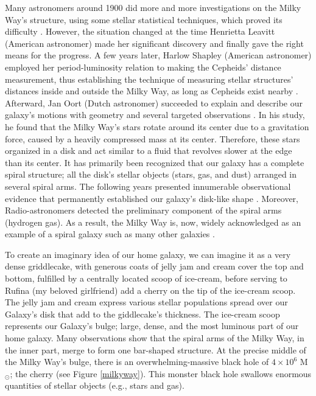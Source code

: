 Many astronomers around 1900 did more and more investigations on the Milky Way's structure, using some stellar statistical techniques, which proved its difficulty \citep{1910KNAB...13..239P,1912JRASC...6..225E,1922HarCi.242....6B,1936PA.....44..466P,1939HarCi.424....1B,1943PhDT.........2M,1950Natur.165..487B,2018RAA....18..146X,2019MNRAS.487.1400C}. However, the situation changed at the time Henrietta Leavitt (American astronomer) made her significant discovery \citep[period-luminosity relation,][]{1908AnHar..60...87L,1912HarCi.173....1L} and finally gave the right means for the progress. A few years later, Harlow Shapley (American astronomer) employed her period-luminosity relation to making the Cepheids' distance measurement, thus establishing the technique of measuring stellar structures' distances inside and outside the Milky Way, as long as Cepheids exist nearby \citep{1927HarCi.314....1S}. Afterward, Jan Oort (Dutch astronomer) succeeded to explain and describe our galaxy's motions with geometry and several targeted observations \citep{1927BAN.....4...79O}. In his study, he found that the Milky Way's stars rotate around its center due to a gravitation force, caused by a heavily compressed mass at its center. Therefore, these stars organized in a disk and act similar to a fluid that revolves slower at the edge than its center. It has primarily been recognized that our galaxy has a complete spiral structure; all the disk's stellar objects (stars, gas, and dust) arranged in several spiral arms. The following years presented innumerable observational evidence that permanently established our galaxy's disk-like shape \citep{2018ApJ...859L...8H}. Moreover, Radio-astronomers detected the preliminary component of the spiral arms (hydrogen gas). As a result, the Milky Way is, now, widely acknowledged as an example of a spiral galaxy such as many other galaxies \citep[e.g.,] [Andromeda and NGC 6744]{2017PhDT........53Y}.

To create an imaginary idea of our home galaxy, we can imagine it as a very dense griddlecake, with generous coats of jelly jam and cream cover the top and bottom, fulfilled by a centrally located scoop of ice-cream, before serving to Rufina (my beloved girlfriend) add a cherry on the tip of the ice-cream scoop. The jelly jam and cream express various stellar populations spread over our Galaxy's disk that add to the giddlecake's thickness. The ice-cream scoop represents our Galaxy's bulge; large, dense, and the most luminous part of our home galaxy. Many observations show that the spiral arms of the Milky Way, in the inner part, merge to form one bar-shaped structure. At the precise middle of the Milky Way's bulge, there is an overwhelming-massive black hole of $4 \times 10^{6}$ M$_{\odot}$; the cherry (see Figure \ref{milkyway}). This monster black hole swallows enormous quantities of stellar objects (e.g., stars and gas). 


